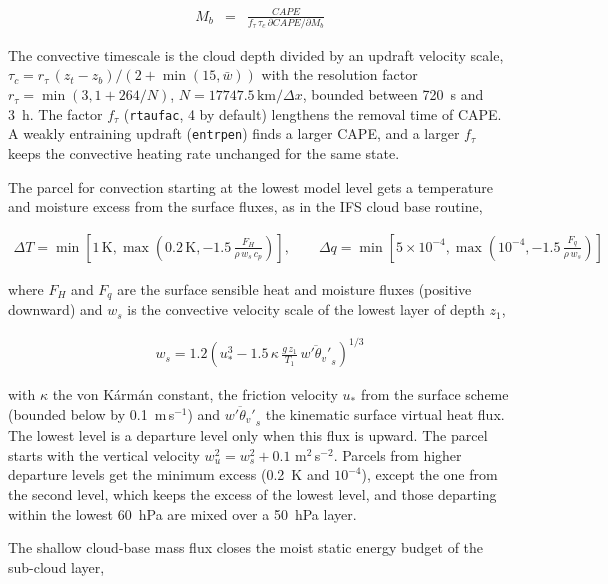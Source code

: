 {\begin{enumerate}
\begin{eqnarray}
M_b &=& \frac{CAPE}{f_\tau\,\tau_c\,\partial CAPE / \partial M_b}
\label{eqn_model:TIEDcape}
\end{eqnarray}

The convective timescale is the cloud depth divided by an updraft velocity
scale, $\tau_c = r_\tau\,(z_t-z_b)/(2+\min(15,\bar{w}))$ with the resolution
factor $r_\tau=\min(3,1+264/N)$, $N = 17747.5\,\mathrm{km}/\Delta x$, bounded
between 720~s and 3~h. The factor $f_\tau$ (\verb=rtaufac=, 4 by default)
lengthens the removal time of CAPE. A weakly entraining updraft
(\verb=entrpen=) finds a larger CAPE, and a larger $f_\tau$ keeps the
convective heating rate unchanged for the same state.

The parcel for convection starting at the lowest model level gets a
temperature and moisture excess from the surface fluxes, as in the IFS
cloud base routine,

\begin{eqnarray}
\Delta T = \min\left[1\,\mathrm{K},\max\left(0.2\,\mathrm{K},
  -1.5\,\frac{F_H}{\rho\,w_s\,c_p}\right)\right], \qquad
\Delta q = \min\left[5\times10^{-4},\max\left(10^{-4},
  -1.5\,\frac{F_q}{\rho\,w_s}\right)\right]
\label{eqn_model:TIEDexcess}
\end{eqnarray}

where $F_H$ and $F_q$ are the surface sensible heat and moisture fluxes
(positive downward) and $w_s$ is the convective velocity scale of the lowest
layer of depth $z_1$,

\begin{eqnarray}
w_s = 1.2\left(u_*^3 - 1.5\,\kappa\,\frac{g\,z_1}{T_1}\,
      \overline{w'\theta_v'}_s\right)^{1/3}
\label{eqn_model:TIEDws}
\end{eqnarray}

with $\kappa$ the von K\'arm\'an constant, the friction velocity $u_*$ from
the surface scheme (bounded below by 0.1~m\,s$^{-1}$) and
$\overline{w'\theta_v'}_s$ the kinematic surface virtual heat flux. The
lowest level is a departure level only when this flux is upward. The
parcel starts with the vertical velocity $w_u^2 = w_s^2 + 0.1$
m$^2$\,s$^{-2}$. Parcels from higher departure levels get the minimum
excess (0.2~K and $10^{-4}$), except the one from the second level, which
keeps the excess of the lowest level, and those departing within the lowest
60~hPa are mixed over a 50~hPa layer.

The shallow cloud-base mass flux closes the moist static energy budget of
the sub-cloud layer,


\end{enumerate}}
